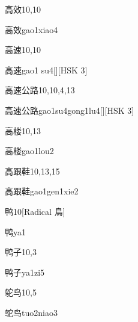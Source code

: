 \begin{entry}{高效}{10,10}
  \begin{phonetics}{高效}{gao1xiao4}
  \end{phonetics}
\end{entry}

\begin{entry}{高速}{10,10}
  \begin{phonetics}{高速}{gao1 su4}[][HSK 3]
  \end{phonetics}
\end{entry}

\begin{entry}{高速公路}{10,10,4,13}
  \begin{phonetics}{高速公路}{gao1su4gong1lu4}[][HSK 3]
  \end{phonetics}
\end{entry}

\begin{entry}{高楼}{10,13}
  \begin{phonetics}{高楼}{gao1lou2}
  \end{phonetics}
\end{entry}

\begin{entry}{高跟鞋}{10,13,15}
  \begin{phonetics}{高跟鞋}{gao1gen1xie2}
  \end{phonetics}
\end{entry}

\begin{entry}{鸭}{10}[Radical 鳥]
  \begin{phonetics}{鸭}{ya1}
  \end{phonetics}
\end{entry}

\begin{entry}{鸭子}{10,3}
  \begin{phonetics}{鸭子}{ya1zi5}
  \end{phonetics}
\end{entry}

\begin{entry}{鸵鸟}{10,5}
  \begin{phonetics}{鸵鸟}{tuo2niao3}
  \end{phonetics}
\end{entry}


